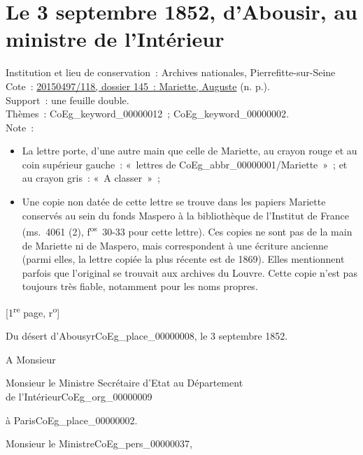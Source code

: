 \documentclass{book}
\begin{document}
\section*{Le 3 septembre 1852, d’Abousir, au ministre de l'Intérieur} 
{\footnotesize \noindent Institution et lieu de conservation~: Archives nationales, Pierrefitte-sur-Seine\\
Cote~: \hyperlink{CoEg_Mariette_ms_001}{20150497/118, dossier 145~: Mariette, Auguste} (n. p.).\\
Support~: une feuille double.\\
Thèmes~: \gls{CoEg_keyword_00000012}~; \gls{CoEg_keyword_00000002}.\\
Note~: \begin{itemize} \item La lettre porte, d’une autre main que celle de Mariette, au crayon rouge et au coin supérieur gauche~: «~lettres de \gls{CoEg_abbr_00000001}/Mariette~»~; et au crayon gris~: «~A classer~»~;
\item Une copie non datée de cette lettre se trouve dans les papiers Mariette conservés au sein du fonds Maspero à la bibliothèque de l’Institut de France (ms.~4061 (2), f\textsuperscript{os}~30-33 pour cette lettre). Ces copies ne sont pas de la main de Mariette ni de Maspero, mais correspondent à une écriture ancienne (parmi elles, la lettre copiée la plus récente est de 1869). Elles mentionnent parfois que l’original se trouvait aux archives du Louvre. Cette copie n’est pas toujours très fiable, notamment pour les noms propres. \end{itemize}
\begin{center} {[1\textsuperscript{re} page, r\textsuperscript{o}]}\end{center}}

\begin{flushright} Du désert d’Abousyr\gls{CoEg_place_00000008}, le 3 septembre 1852.\end{flushright}
\indent A Monsieur\\
\begin{center}Monsieur le Ministre Secrétaire d’Etat au Département\\
de l’Intérieur\gls{CoEg_org_00000009}\end{center}
\begin{flushright}à Paris\gls{CoEg_place_00000002}.\end{flushright}

\hspace{1cm}Monsieur le Ministre\gls{CoEg_pers_00000037},\\
\end{document}
